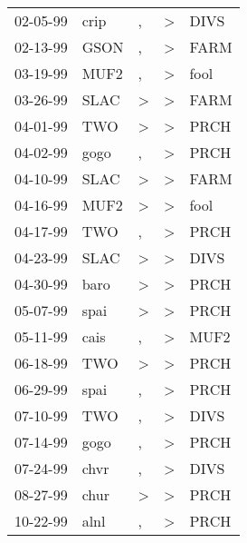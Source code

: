 \begin{supertabular}{lllll}
 02-05-99 &   crip &             , &  \textgreater &  DIVS \\
 02-13-99 &   GSON &             , &  \textgreater &  FARM \\
 03-19-99 &   MUF2 &             , &  \textgreater &  fool \\
 03-26-99 &   SLAC &  \textgreater &  \textgreater &  FARM \\
 04-01-99 &    TWO &  \textgreater &  \textgreater &  PRCH \\
 04-02-99 &   gogo &             , &  \textgreater &  PRCH \\
 04-10-99 &   SLAC &  \textgreater &  \textgreater &  FARM \\
 04-16-99 &   MUF2 &  \textgreater &  \textgreater &  fool \\
 04-17-99 &    TWO &             , &  \textgreater &  PRCH \\
 04-23-99 &   SLAC &  \textgreater &  \textgreater &  DIVS \\
 04-30-99 &   baro &  \textgreater &  \textgreater &  PRCH \\
 05-07-99 &   spai &  \textgreater &  \textgreater &  PRCH \\
 05-11-99 &   cais &             , &  \textgreater &  MUF2 \\
 06-18-99 &    TWO &  \textgreater &  \textgreater &  PRCH \\
 06-29-99 &   spai &             , &  \textgreater &  PRCH \\
 07-10-99 &    TWO &             , &  \textgreater &  DIVS \\
 07-14-99 &   gogo &             , &  \textgreater &  PRCH \\
 07-24-99 &   chvr &             , &  \textgreater &  DIVS \\
 08-27-99 &   chur &  \textgreater &  \textgreater &  PRCH \\
 10-22-99 &   alnl &             , &  \textgreater &  PRCH \\
\end{supertabular}
